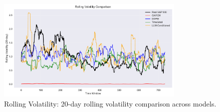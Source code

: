 \begin{figure}[htbp]
\centering
\includegraphics[width=0.8\textwidth]{figures/rolling_volatility.pdf}
\caption{Rolling Volatility: 20-day rolling volatility comparison across models.}
\label{fig:rolling_volatility}
\end{figure}